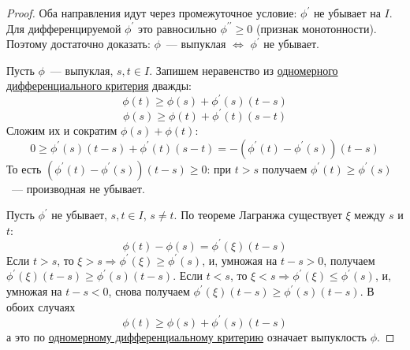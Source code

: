 

\begin{proof}
  Оба направления идут через промежуточное условие: $\phi^{\prime}$ не убывает на $I$. Для дифференцируемой $\phi^{\prime}$ это равносильно $\phi^{\prime\prime} \ge 0$ (признак монотонности). Поэтому достаточно доказать: $\phi$~--- выпуклая $\Leftrightarrow$ $\phi^{\prime}$ не убывает.

  \proofpart{$\Rightarrow$}
  Пусть $\phi$~--- выпуклая, $s, t \in I$. Запишем неравенство из \hyperref[note:2F475EE4-2630-45FD-8DD2-8EA9D48059E4]{одномерного дифференциального критерия} дважды:
  \[
  \phi(t) \ge \phi(s) + \phi^{\prime}(s)(t-s)
  \]
  \[
  \phi(s) \ge \phi(t) + \phi^{\prime}(t)(s-t)
  \]
  Сложим их и сократим $\phi(s) + \phi(t)$:
  \[
  0 \ge \phi^{\prime}(s)(t-s) + \phi^{\prime}(t)(s-t) = -(\phi^{\prime}(t) - \phi^{\prime}(s))(t-s)
  \]
  То есть $(\phi^{\prime}(t) - \phi^{\prime}(s))(t-s) \ge 0$: при $t > s$ получаем $\phi^{\prime}(t) \ge \phi^{\prime}(s)$~--- производная не убывает.

  \proofpart{$\Leftarrow$}
  Пусть $\phi^{\prime}$ не убывает, $s, t \in I$, $s \ne t$. По теореме Лагранжа существует $\xi$ между $s$ и $t$:
  \[
  \phi(t) - \phi(s) = \phi^{\prime}(\xi)(t-s)
  \]
  Если $t > s$, то $\xi > s \Rightarrow \phi^{\prime}(\xi) \ge \phi^{\prime}(s)$, и, умножая на $t - s > 0$, получаем $\phi^{\prime}(\xi)(t-s) \ge \phi^{\prime}(s)(t-s)$.
  Если $t < s$, то $\xi < s \Rightarrow \phi^{\prime}(\xi) \le \phi^{\prime}(s)$, и, умножая на $t - s < 0$, снова получаем $\phi^{\prime}(\xi)(t-s) \ge \phi^{\prime}(s)(t-s)$.
  В обоих случаях
  \[
  \phi(t) \ge \phi(s) + \phi^{\prime}(s)(t-s)
  \]
  а это по \hyperref[note:2F475EE4-2630-45FD-8DD2-8EA9D48059E4]{одномерному дифференциальному критерию} означает выпуклость $\phi$.
\end{proof}
